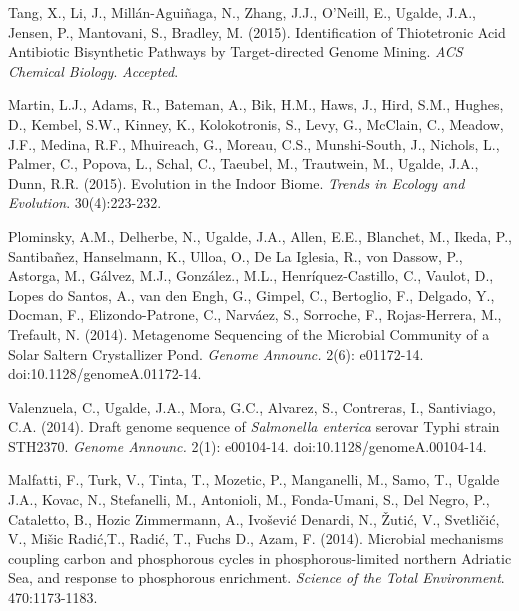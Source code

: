 \documentclass[10pt,letterpaper]{article}
\begin{document}
\begin{etaremune}

\item Tang, X., Li, J., Mill\'an-Agui\~naga, N., Zhang, J.J., O'Neill, E., Ugalde, J.A., Jensen, P., Mantovani, S., Bradley, M. (2015). Identification of Thiotetronic Acid Antibiotic Bisynthetic Pathways by Target-directed Genome Mining. \textit{ACS Chemical Biology}. \textit{Accepted}.

\item Martin, L.J., Adams, R., Bateman, A., Bik, H.M., Haws, J., Hird, S.M., Hughes, D., Kembel, S.W., Kinney, K., Kolokotronis, S., Levy, G., McClain, C., Meadow, J.F., Medina, R.F., Mhuireach, G., Moreau, C.S., Munshi-South, J., Nichols, L., Palmer, C., Popova, L., Schal, C., Taeubel, M., Trautwein, M., Ugalde, J.A., Dunn, R.R. (2015). Evolution in the Indoor Biome. \textit{Trends in Ecology and Evolution}. 30(4):223-232.

\item Plominsky, A.M., Delherbe, N., Ugalde, J.A., Allen, E.E., Blanchet, M., Ikeda, P., Santiba\~nez, Hanselmann, K., Ulloa, O., De La Iglesia, R., von Dassow, P., Astorga, M., G\'alvez, M.J., Gonz\'alez., M.L., Henr\'iquez-Castillo, C., Vaulot, D., Lopes do Santos, A., van den Engh, G., Gimpel, C., Bertoglio, F., Delgado, Y., Docman, F., Elizondo-Patrone, C., Narv\'aez, S., Sorroche, F., Rojas-Herrera, M., Trefault, N. (2014). Metagenome Sequencing of the Microbial Community of a Solar Saltern Crystallizer Pond. \textit{Genome Announc.} 2(6): e01172-14. doi:10.1128/genomeA.01172-14.

\item Valenzuela, C., Ugalde, J.A., Mora, G.C., Alvarez, S., Contreras, I., Santiviago, C.A. (2014). Draft genome sequence of \textit{Salmonella enterica} serovar Typhi strain STH2370. \textit{Genome Announc.} 2(1): e00104-14. doi:10.1128/genomeA.00104-14.

\item Malfatti, F., Turk, V., Tinta, T., Mozetic, P., Manganelli, M., Samo, T., Ugalde J.A., Kovac, N., Stefanelli, M., Antonioli, M., Fonda-Umani, S., Del Negro, P., Cataletto, B., Hozic Zimmermann, A., Ivo\v{s}evi\'{c} Denardi, N., Žuti\'{c}, V., Svetli\v{c}i\'{c}, V., Mi\v{s}ic Radi\'{c},T., Radi\'{c}, T., Fuchs D., Azam, F. (2014). Microbial mechanisms coupling carbon and phosphorous cycles in phosphorous-limited northern Adriatic Sea, and response to phosphorous enrichment. \textit{Science of the Total Environment}. 470:1173-1183.


\end{etaremune}
\end{document}
